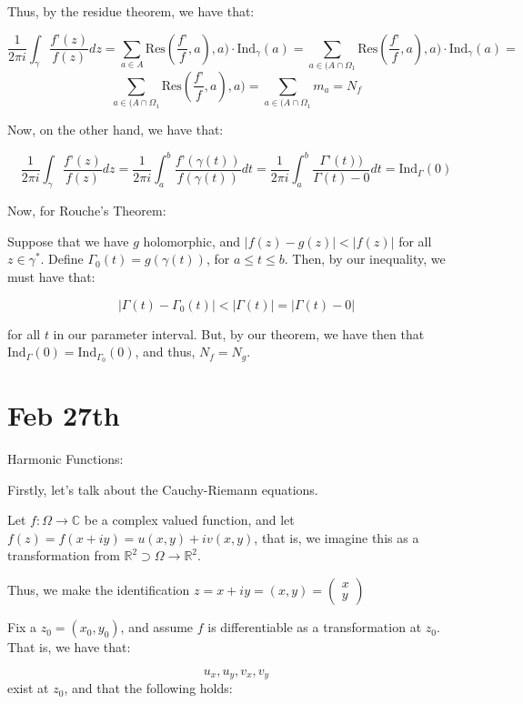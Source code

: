 \documentclass[10pt]{article}
\newcommand{\ind}{\text{Ind}}
\newcommand{\res}{\text{Res}}
\begin{document}
Thus, by the residue theorem, we have that:

$$\frac{1}{2\pi i} \int_\gamma  \frac{f’(z)}{f(z)} dz = \sum_{a \in A} \res(\frac{f’}{f}, a), a) \cdot \ind_\gamma(a) = \sum_{a \in (A\cap \Omega_1} \res(\frac{f’}{f}, a), a) \cdot \ind_\gamma(a)=$$
$$\sum_{a \in (A\cap \Omega_1} \res(\frac{f’}{f}, a), a) = \sum_{a \in (A\cap \Omega_1} m_a = N_f$$

Now, on the other hand, we have that:

$$\frac{1}{2\pi i}\int_\gamma  \frac{f’(z)}{f(z)} dz = \frac{1}{2\pi i}\int_a^b  \frac{f’(\gamma(t))}{f(\gamma(t))} dt = \frac{1}{2\pi i}\int_a^b  \frac{\Gamma’(t))}{\Gamma(t) - 0} dt = \ind_\Gamma(0) $$

Now, for Rouche’s Theorem:

Suppose that we have $g$ holomorphic, and $| f(z) - g(z) | < |f(z)|$ for all $z \in \gamma^*$. Define $\Gamma_0(t) = g(\gamma(t))$, for $a \leq t \leq b$. Then, by our inequality, we must have that:

$$ | \Gamma(t) - \Gamma_0(t) | < | \Gamma(t) |  = |\Gamma(t) - 0|$$

for all $t$ in our parameter interval. But, by our theorem, we have then that $\ind_{\Gamma}(0) = \ind_{\Gamma_0}(0)$, and thus, $N_f = N_g$.

\section*{Feb 27th}

Harmonic Functions:

Firstly, let’s talk about the Cauchy-Riemann equations.

Let $f: \Omega \to \mathbb{C}$ be a complex valued function, and let $f(z) = f(x + iy) = u(x,y) + iv(x,y)$, that is, we imagine this as a transformation from $\mathbb{R}^2 \supset \Omega \to \mathbb{R}^2$.

Thus, we make the identification $z = x + iy = (x,y) = \begin{pmatrix} x \\ y \end{pmatrix}$

Fix a $z_0 = (x_0, y_0)$, and assume $f$ is differentiable as a transformation at $z_0$. That is, we have that:

$$ u_x, u_y, v_x, v_y $$ exist at $z_0$, and that the following holds:
\end{document}
